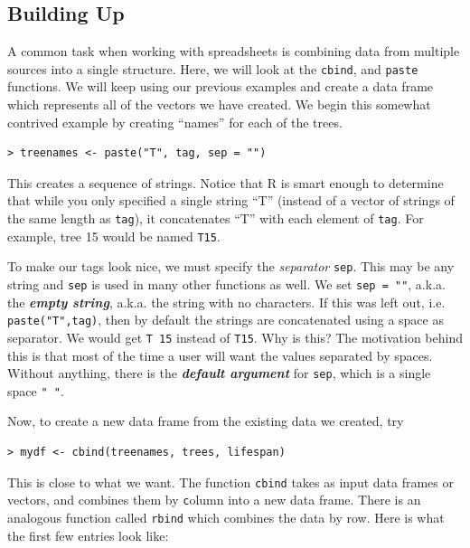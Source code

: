 \documentclass[12pt]{article}
\theoremstyle{remark}
\newcommand{\vocab}[1]{\textbf{\emph{#1}}}
\begin{document}
\subsection{Building Up}
A common task when working with spreadsheets is combining data from multiple sources into a single structure. Here, we will look at the \verb|cbind|, and \verb|paste| functions. We will keep using our previous examples and create a data frame which represents all of the vectors we have created. We begin this somewhat contrived example by creating ``names'' for each of the trees.

\begin{verbatim}
> treenames <- paste("T", tag, sep = "")
\end{verbatim}

This creates a sequence of strings. Notice that R is smart enough to determine that while you only specified a single string ``T'' (instead of a vector of strings of the same length as \verb|tag|), it concatenates ``T'' with each element of \verb|tag|. For example, tree 15 would be named \verb|T15|.

To make our tags look nice, we must specify the \emph{separator} \verb|sep|. This may be any string and \verb|sep| is used in many other functions as well. We set \verb|sep = ""|, a.k.a. the \vocab{empty string}, a.k.a. the string with no characters. If this was left out, i.e. \verb|paste("T",tag)|, then by default the strings are concatenated using a space as separator. We would get \verb|T 15| instead of \verb|T15|. Why is this? The motivation behind this is that most of the time a user will want the values separated by spaces. Without anything, there is the \vocab{default argument} for \verb|sep|, which is a single space \verb|" "|.

Now, to create a new data frame from the existing data we created, try
\begin{verbatim}
> mydf <- cbind(treenames, trees, lifespan)
\end{verbatim}
This is close to what we want. The function \verb|cbind| takes as input data frames or vectors, and combines them by \verb|c|olumn into a new data frame. There is an analogous function called \verb|rbind| which combines the data by row. Here is what the first few entries look like:
\end{document}
